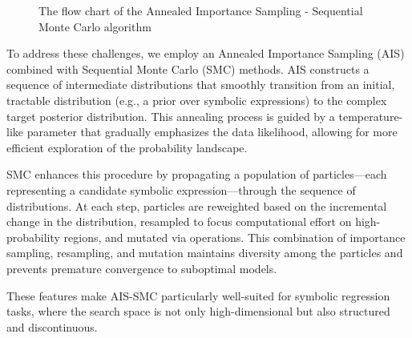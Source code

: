 \documentclass[11pt,a4paper]{article}
\begin{document}
\begin{figure}[h!]
\begin{minipage}{15cm}
\begin{tcolorbox}
				\end{tcolorbox}
			\end{minipage}
			\caption{The flow chart of the Annealed Importance Sampling - Sequential Monte Carlo algorithm}
			\label{ASMCflowchart}
		\end{figure}
		
		To address these challenges, we employ an Annealed Importance Sampling (AIS) combined with Sequential Monte Carlo (SMC) methods. AIS constructs a sequence of intermediate distributions that smoothly transition from an initial, tractable distribution (e.g., a prior over symbolic expressions) to the complex target posterior distribution. This annealing process is guided by a temperature-like parameter that gradually emphasizes the data likelihood, allowing for more efficient exploration of the probability landscape.
		
		SMC enhances this procedure by propagating a population of particles—each representing a candidate symbolic expression—through the sequence of distributions. At each step, particles are reweighted based on the incremental change in the distribution, resampled to focus computational effort on high-probability regions, and mutated via operations. This combination of importance sampling, resampling, and mutation maintains diversity among the particles and prevents premature convergence to suboptimal models.
		
		These features make AIS-SMC particularly well-suited for symbolic regression tasks, where the search space is not only high-dimensional but also structured and discontinuous. 
		
		
\end{document}
